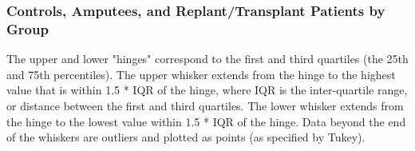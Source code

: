 \documentclass{beamer}
\begin{document}
\begin{frame}
\frametitle{Controls, Amputees, and Replant/Transplant Patients by Group}
\begin{figure}
\setlength{\fboxsep}{0pt}%
\setlength{\fboxrule}{1pt}%
\end{figure}
\tiny
The upper and lower "hinges" correspond to the first and third quartiles (the 25th and 75th percentiles). The upper whisker extends from the hinge to the highest value that is within 1.5 * IQR of the hinge, where IQR is the inter-quartile range, or distance between the first and third quartiles. The lower whisker extends from the hinge to the lowest value within 1.5 * IQR of the hinge. Data beyond the end of the whiskers are outliers and plotted as points (as specified by Tukey).
\end{frame}
\end{document}
